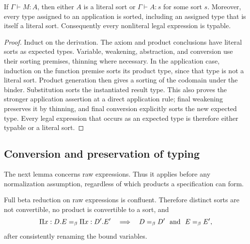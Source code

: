 \begin{lemma}\label{pts:correctness}
If $\Gamma\vdash M:A$, then either $A$ is a literal sort or
$\Gamma\vdash A:s$ for some sort $s$. Moreover, every type assigned
to an application is sorted, including an assigned type that is itself
a literal sort. Consequently every nonliteral legal expression is
typable.
\end{lemma}

\begin{proof}
Induct on the derivation. The axiom and product conclusions have literal
sorts as expected types. Variable, weakening, abstraction, and conversion
use their sorting premises, thinning where necessary. In the application
case, induction on the function premise sorts its product type, since
that type is not a literal sort. Product generation then gives a sorting
of the codomain under the binder. Substitution sorts the instantiated
result type. This also proves the stronger application assertion at
a direct application rule; final weakening preserves it by thinning,
and final conversion explicitly sorts the new expected type. Every
legal expression that occurs as an expected type is therefore either
typable or a literal sort.
\end{proof}

\subsection{Conversion and preservation of typing}
\label{pts:reduction-metatheory}

The next lemma concerns raw expressions. Thus it applies before any
normalization assumption, regardless of which products a specification
can form.

\begin{lemma}\label{pts:confluence}
Full beta reduction on raw expressions is confluent. Therefore distinct
sorts are not convertible, no product is convertible to a sort, and
\[
 \Pi x:D.E=_\beta\Pi x:D'.E'
 \quad\Longrightarrow\quad
 D=_\beta D'\ \hbox{ and }\ E=_\beta E',
\]
after consistently renaming the bound variables.
\end{lemma}

